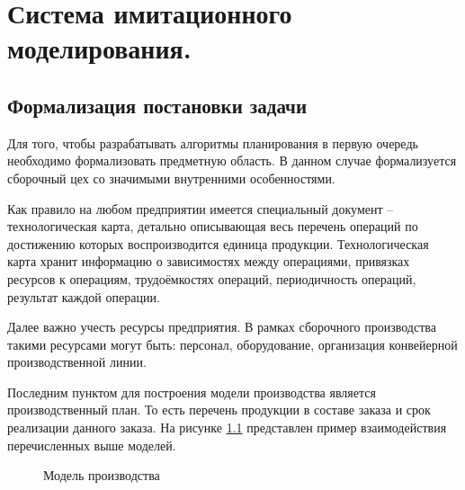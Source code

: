 \chapter{Система имитационного моделирования.}

\section{Формализация постановки задачи}
Для того, чтобы разрабатывать алгоритмы планирования в первую очередь необходимо формализовать предметную область. В данном случае формализуется сборочный цех со значимыми внутренними особенностями.

Как правило на любом предприятии имеется специальный документ – технологическая карта, детально описывающая весь перечень операций по достижению которых воспроизводится единица продукции. Технологическая карта хранит информацию о зависимостях между операциями, привязках ресурсов к операциям, трудоёмкостях операций, периодичность операций, результат каждой операции. 

Далее важно учесть ресурсы предприятия. В рамках сборочного производства такими ресурсами могут быть: персонал, оборудование, организация конвейерной производственной линии.

Последним пунктом для построения модели производства является производственный план. То есть перечень продукции в составе заказа и срок реализации данного заказа. На рисунке \ref{ris:Prod1} представлен пример взаимодействия перечисленных выше моделей. 

\begin{figure}[H]
    \caption{Модель производства}
    \label{ris:Prod1}
\end{figure}


